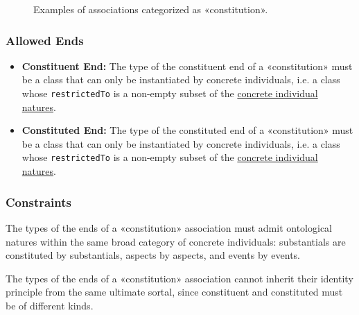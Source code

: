 \begin{figure}[h]
    \centering
    
    \caption{Examples of associations categorized as «constitution».}
    \label{fig:constitution-example}
\end{figure}

\subsubsection{Allowed Ends}
\begin{itemize}
    \item \textbf{Constituent End:} The type of the constituent end of a «constitution» must be a class that can only be instantiated by concrete individuals, i.e. a class whose \texttt{restrictedTo} is a non-empty subset of the \hyperref[par:concrete-individual-nature]{concrete individual natures}.
    \item \textbf{Constituted End:} The type of the constituted end of a «constitution» must be a class that can only be instantiated by concrete individuals, i.e. a class whose \texttt{restrictedTo} is a non-empty subset of the \hyperref[par:concrete-individual-nature]{concrete individual natures}.
\end{itemize}

\subsubsection{Constraints}

\begin{constraint}
\label{constraint:constitutionEndsOfSameCategory}

The types of the ends of a «constitution» association must admit ontological natures within the same broad category of concrete individuals: substantials are constituted by substantials, aspects by aspects, and events by events. 

\end{constraint}

\begin{constraint}
\label{constraint:constitutionEndsOfDifferentKinds}

The types of the ends of a «constitution» association cannot inherit their identity principle from the same ultimate sortal, since constituent and constituted must be of different kinds.

\end{constraint}


